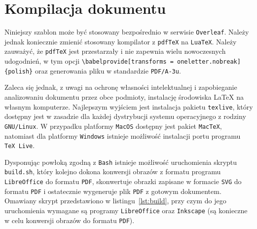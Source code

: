 \chapter{Kompilacja dokumentu}

Niniejszy szablon może być stosowany bezpośrednio w serwisie \verb|Overleaf|. Należy jednak koniecznie zmienić stosowany kompilator z \verb|pdfTeX| na \verb|LuaTeX|. Należy zauważyć, że \verb|pdfTeX| jest przestarzały i nie zapewnia wielu nowoczesnych udogodnień, w tym opcji \verb|\babelprovide[transforms = oneletter.nobreak]{polish}| oraz generowania pliku w standardzie \verb|PDF/A-3u|.

Zaleca się jednak, z uwagi na ochronę własności intelektualnej i zapobieganie analizowaniu dokumentu przez obce podmioty, instalację środowiska \LaTeX{} na własnym komputerze. Najlepszym wyjściem jest instalacja pakietu \verb|texlive|, który dostępny jest w zasadzie dla każdej dystrybucji systemu operacyjnego z rodziny \verb|GNU/Linux|. W przypadku platformy \verb|MacOS| dostępny jest pakiet \verb|MacTeX|, natomiast dla platformy \verb|Windows| istnieje możliwość instalacji portu programu \verb|TeX Live|.

Dysponując powłoką zgodną z \verb|Bash| istnieje możliwość uruchomienia skryptu \verb|build.sh|, który kolejno dokona konwersji obrazów z formatu programu \verb|LibreOffice| do formatu \verb|PDF|, skonwertuje obrazki zapisane w formacie \verb|SVG| do formatu \verb|PDF| i ostatecznie wygeneruje plik \verb|PDF| z gotowym dokumentem. Omawiany skrypt przedstawiono w listingu~\ref{lst:build}, przy czym do jego uruchomienia wymagane są programy \verb|LibreOffice| oraz \verb|Inkscape| (są konieczne w celu konwersji obrazów do formatu \verb|PDF|).

\begin{listing}[hbt!]
\inputminted[linenos, breaklines]{bash}{build.sh}
\end{listing}

